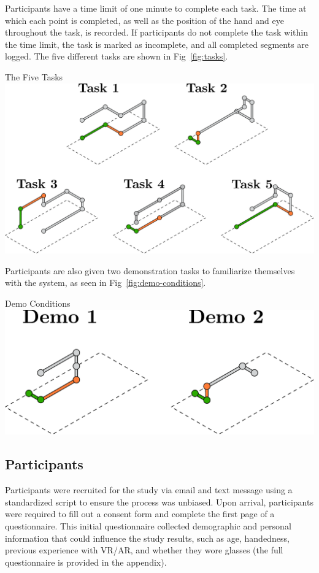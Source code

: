 Participants have a time limit of one minute to complete each task. The time at which each point is completed, as well as the position of the hand and eye throughout the task, is recorded. If participants do not complete the task within the time limit, the task is marked as incomplete, and all completed segments are logged. The five different tasks are shown in Fig~\ref{fig:tasks}.

\begin{figureBox}[label={fig:tasks}, width=1.0\linewidth]{The Five Tasks}
    \includegraphics[width=0.8\linewidth]{./implementation/figures/tasks.pdf}
\end{figureBox}

Participants are also given two demonstration tasks to familiarize themselves with the system, as seen in Fig~\ref{fig:demo-conditions}.

\begin{figureBox}[label={fig:demo-conditions}, width=0.8\linewidth]{Demo Conditions}
    \includegraphics[width=0.65\linewidth]{./implementation/figures/demos.pdf}
\end{figureBox}


\subsection{Participants}

Participants were recruited for the study via email and text message using a standardized script to ensure the process was unbiased. Upon arrival, participants were required to fill out a consent form and complete the first page of a questionnaire. This initial questionnaire collected demographic and personal information that could influence the study results, such as age, handedness, previous experience with VR/AR, and whether they wore glasses (the full questionnaire is provided in the appendix). \\

